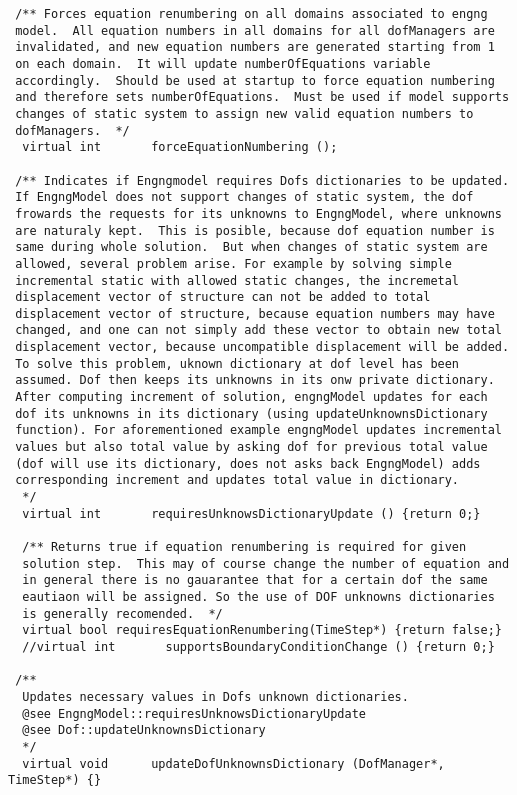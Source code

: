 \documentclass[12pt,draft]{article}
\begin{document}
{\begin{verbatim}
 /** Forces equation renumbering on all domains associated to engng
 model.  All equation numbers in all domains for all dofManagers are
 invalidated, and new equation numbers are generated starting from 1
 on each domain.  It will update numberOfEquations variable
 accordingly.  Should be used at startup to force equation numbering
 and therefore sets numberOfEquations.  Must be used if model supports
 changes of static system to assign new valid equation numbers to
 dofManagers.  */
  virtual int       forceEquationNumbering ();

 /** Indicates if Engngmodel requires Dofs dictionaries to be updated.
 If EngngModel does not support changes of static system, the dof
 frowards the requests for its unknowns to EngngModel, where unknowns
 are naturaly kept.  This is posible, because dof equation number is
 same during whole solution.  But when changes of static system are
 allowed, several problem arise. For example by solving simple
 incremental static with allowed static changes, the incremetal
 displacement vector of structure can not be added to total
 displacement vector of structure, because equation numbers may have
 changed, and one can not simply add these vector to obtain new total
 displacement vector, because uncompatible displacement will be added.
 To solve this problem, uknown dictionary at dof level has been
 assumed. Dof then keeps its unknowns in its onw private dictionary.
 After computing increment of solution, engngModel updates for each
 dof its unknowns in its dictionary (using updateUnknownsDictionary
 function). For aforementioned example engngModel updates incremental
 values but also total value by asking dof for previous total value
 (dof will use its dictionary, does not asks back EngngModel) adds
 corresponding increment and updates total value in dictionary.
  */
  virtual int       requiresUnknowsDictionaryUpdate () {return 0;}

  /** Returns true if equation renumbering is required for given
  solution step.  This may of course change the number of equation and
  in general there is no gauarantee that for a certain dof the same
  eautiaon will be assigned. So the use of DOF unknowns dictionaries
  is generally recomended.  */
  virtual bool requiresEquationRenumbering(TimeStep*) {return false;}
  //virtual int       supportsBoundaryConditionChange () {return 0;}

 /**
  Updates necessary values in Dofs unknown dictionaries. 
  @see EngngModel::requiresUnknowsDictionaryUpdate
  @see Dof::updateUnknownsDictionary
  */
  virtual void      updateDofUnknownsDictionary (DofManager*, TimeStep*) {}


\end{verbatim}}
\end{document}
